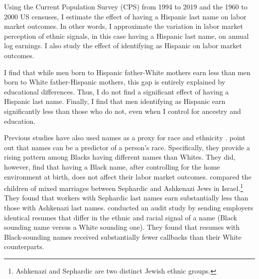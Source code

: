 \documentclass[12pt,english]{article}
\begin{document}
Using the Current Population Survey (CPS) from 1994 to 2019 and the 1960 to 2000 US censuses, I estimate the effect of having a Hispanic last name on labor market outcomes. In other words, I approximate the variation in labor market perception of ethnic signals, in this case having a Hispanic last name, on annual log earnings. I also study the effect of identifying as Hispanic on labor market outcomes. 

I find that while men born to Hispanic father-White mothers earn less than men born to White father-Hispanic mothers, this gap is entirely explained by educational differences. Thus, I do not find a significant effect of having a Hispanic last name. Finally, I find that men identifying as Hispanic earn significantly less than those who do not, even when I control for ancestry and education.



Previous studies have also used names as a proxy for race and ethnicity \autocite{fryer2004causes, rubinstein2014pride, bertrand2004emily}. \textcite{fryer2004causes} point out that names can be a predictor of a person's race. Specifically, they provide a rising pattern among Blacks having different names than Whites. They did, however, find that having a Black name, after controlling for the home environment at birth, does not affect their labor market outcomes. \textcite{rubinstein2014pride} compared the children of mixed marriages between Sephardic and Ashkenazi Jews in Israel.\footnote{Ashkenazi and Sephardic are two distinct Jewish ethnic groups.} They found that workers with Sephardic last names earn substantially less than those with Ashkenazi last names. \textcite{bertrand2004emily} conducted an audit study by sending employers identical resumes that differ in the ethnic and racial signal of a name (Black sounding name versus a White sounding one). They found that resumes with Black-sounding names received substantially fewer callbacks than their White counterparts. 
\end{document}
